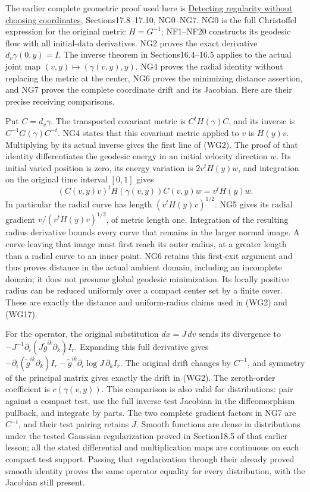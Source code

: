 \documentclass[
  11pt,
]{article}
\begin{document}
The earlier complete geometric proof used here is
\href{geometric-microlocal-calculus.pdf}{Detecting regularity without
choosing coordinates}, Sections17.8--17.10, NG0--NG7. NG0 is the full
Christoffel expression for the original metric \(H=G^{-1}\); NF1--NF20
constructs its geodesic flow with all initial-data derivatives. NG2
proves the exact derivative \(d_v\gamma(0,y)=I\). The inverse theorem in
Sections16.4--16.5 applies to the actual joint map
\((v,y)\mapsto(\gamma(v,y),y)\). NG4 proves the radial identity without
replacing the metric at the center, NG6 proves the minimizing distance
assertion, and NG7 proves the complete coordinate drift and its
Jacobian. Here are their precise receiving comparisons.

Put \(C=d_v\gamma\). The transported covariant metric is
\(C^tH(\gamma)C\), and its inverse is \(C^{-1}G(\gamma)C^{-t}\). NG4
states that this covariant metric applied to \(v\) is \(H(y)v\).
Multiplying by its actual inverse gives the first line of (WG2). The
proof of that identity differentiates the geodesic energy in an initial
velocity direction \(w\). Its initial varied position is zero, its
energy variation is \(2v^tH(y)w\), and integration on the original time
interval \([0,1]\) gives \[
 (C(v,y)v)^tH(\gamma(v,y))C(v,y)w=v^tH(y)w.
 \tag{WT1}
\] In particular the radial curve has length \((v^tH(y)v)^{1/2}\). NG5
gives its radial gradient \(v/(v^tH(y)v)^{1/2}\), of metric length one.
Integration of the resulting radius derivative bounds every curve that
remains in the larger normal image. A curve leaving that image must
first reach its outer radius, at a greater length than a radial curve to
an inner point. NG6 retains this first-exit argument and thus proves
distance in the actual ambient domain, including an incomplete domain;
it does not presume global geodesic minimization. Its locally positive
radius can be reduced uniformly over a compact center set by a finite
cover. These are exactly the distance and uniform-radius claims used in
(WG2) and (WG17).

For the operator, the original substitution \(dx=J\,dv\) sends its
divergence to \(-J^{-1}\partial_i(J\widetilde g^{ik}\partial_k)I_r\).
Expanding this full derivative gives
\(-\partial_i(\widetilde g^{ik}\partial_k)I_r-\widetilde g^{ik}\partial_i\log J\,\partial_k I_r\).
The original drift changes by \(C^{-1}\), and symmetry of the principal
matrix gives exactly the drift in (WG2). The zeroth-order coefficient is
\(c(\gamma(v,y))\). This comparison is also valid for distributions:
pair against a compact test, use the full inverse test Jacobian in the
diffeomorphism pullback, and integrate by parts. The two complete
gradient factors in NG7 are \(C^{-t}\), and their test pairing retains
\(J\). Smooth functions are dense in distributions under the tested
Gaussian regularization proved in Section18.5 of that earlier lesson;
all the stated differential and multiplication maps are continuous on
each compact test support. Passing that regularization through their
already proved smooth identity proves the same operator equality for
every distribution, with the Jacobian still present.
\end{document}
